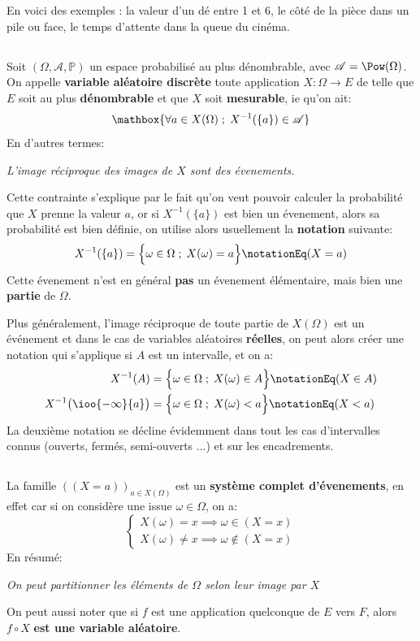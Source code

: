 En voici des exemples : la valeur d'un dé entre 1 et 6, le côté de la pièce dans un pile ou face, le temps d'attente dans la queue du cinéma.

\subsection*{}
Soit \((\Omega, \mathscr{A}, \mathbb{P})\) un espace probabilisé au plus dénombrable, avec \(\mathscr{A} = \Pow(\Omega)\).\+
On appelle \textbf{variable aléatoire discrète} toute application \(X: \Omega \longrightarrow E\) de telle que \(E\) soit au plus \textbf{dénombrable} et que \(X\) soit \textbf{mesurable}, ie qu'on ait:
\[
   \mathbox{
      \forall a \in X(\Omega) \; ; \; X^{-1}(\{a\}) \in \mathscr{A}
   }
\]
En d'autres termes:
\begin{center}
   \textit{L'image réciproque des images de \(X\) sont des évenements.}
\end{center}
Cette contrainte s'explique par le fait qu'on veut pouvoir calculer la probabilité que \(X\) prenne la valeur \(a\), or si \(X^{-1}(\{a\})\) est bien un évenement, alors sa probabilité est bien définie, on utilise alors usuellement la \textbf{notation} suivante:
\[
   X^{-1}(\{a\}) = \Bigl\{ \omega \in \Omega \; ; \;  X(\omega) = a\Bigl\} \notationEq (X = a)  
\]
Cette évenement n'est en général \textbf{pas} un évenement élémentaire, mais bien une \textbf{partie} de \(\Omega\).\<

Plus généralement, l'image réciproque de toute partie de \(X(\Omega)\) est un événement et dans le cas de variables aléatoires \textbf{réelles}, on peut alors créer une notation qui s'applique si \(A\) est un intervalle, et on a:
\begin{align*}
   X^{-1}(A) &= \Bigl\{ \omega \in \Omega \; ; \;  X(\omega) \in A\Bigl\} \notationEq (X \in A) \\
   X^{-1}\bigl(\ioo{-\infty}{a}\bigl) &= \Bigl\{ \omega \in \Omega \; ; \;  X(\omega) < a\Bigl\} \notationEq (X < a)
\end{align*}
La deuxième notation se décline évidemment dans tout les cas d'intervalles connus (ouverts, fermés, semi-ouverts ...) et sur les encadrements.\+

\subsection*{}
La famille \(((X = a))_{a \in X(\Omega)}\) est un \textbf{système complet d'évenements}, en effet car si on considère une issue \(\omega \in \Omega\), on a:
\[
   \begin{cases}
      X(\omega) = x \implies \omega \in (X = x)\\  
      X(\omega) \neq x \implies \omega \notin (X = x)   
   \end{cases} 
\]
En résumé:
\begin{center}
   \textit{On peut partitionner les éléments de \(\Omega\) selon leur image par \(X\)}
\end{center}
On peut aussi noter que si \(f\) est une application quelconque de \(E\) vers \(F\), alors \(f \circ X\) \textbf{est une variable aléatoire}.

